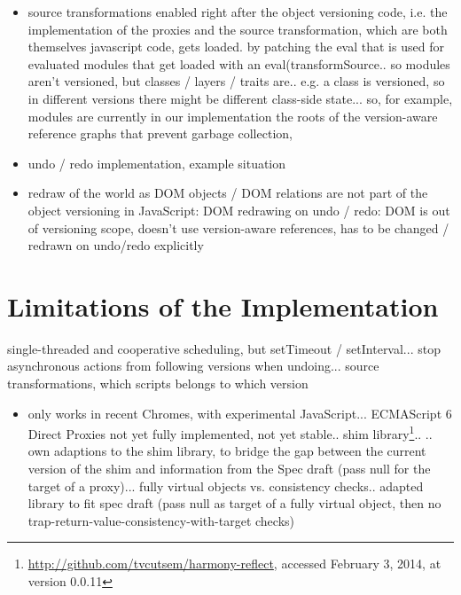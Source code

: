 \begin{itemize}
    \item source transformations enabled right after the object versioning code, i.e. the implementation of the proxies and the source transformation, which are both themselves javascript code, gets loaded. by patching the eval that is used for evaluated modules that get loaded with an eval(transformSource.. so modules aren’t versioned, but classes / layers / traits are.. e.g. a class is versioned, so in different versions there might be different class-side state... so, for example, modules are currently in our implementation the roots of the version-aware reference graphs that prevent garbage collection, 
\end{itemize}


\begin{itemize}
    \item undo / redo implementation, example situation
    \item redraw of the world as DOM objects / DOM relations are not part of the object versioning in JavaScript: DOM redrawing on undo / redo: DOM is out of versioning scope, doesn’t use version-aware references, has to be changed / redrawn on undo/redo explicitly
    
\end{itemize}






\section{Limitations of the Implementation}




single-threaded and cooperative scheduling, but setTimeout / setInterval... stop asynchronous actions from following versions when undoing... source transformations, which scripts belongs to which version



\begin{itemize}
    \item only works in recent Chromes, with experimental JavaScript... ECMAScript 6 Direct Proxies not yet fully implemented, not yet stable.. shim library\footnote{\url{http://github.com/tvcutsem/harmony-reflect}, accessed February 3, 2014, at version 0.0.11}..
.. own adaptions to the shim library, to bridge the gap between the current version of the shim and information from the Spec draft (pass null for the target of a proxy)... fully virtual objects vs. consistency checks.. adapted library to fit spec draft (pass null as target of a fully virtual object, then no trap-return-value-consistency-with-target checks)
\end{itemize}
    





